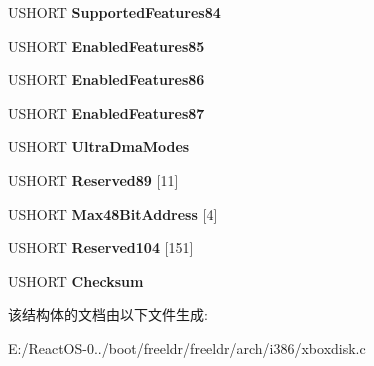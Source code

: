\begin{DoxyCompactItemize}
U\+S\+H\+O\+RT {\bfseries Supported\+Features84}
\item 
\mbox{\label{struct___i_d_e___d_r_i_v_e___i_d_e_n_t_i_f_y_a8e9829537d4672036589e1d4fa4ccbb3}} 
U\+S\+H\+O\+RT {\bfseries Enabled\+Features85}
\item 
\mbox{\label{struct___i_d_e___d_r_i_v_e___i_d_e_n_t_i_f_y_ae35050a0efdbc530e7638045e5b096e8}} 
U\+S\+H\+O\+RT {\bfseries Enabled\+Features86}
\item 
\mbox{\label{struct___i_d_e___d_r_i_v_e___i_d_e_n_t_i_f_y_ae9ae43fd8cdb48f83b5dfef9c3bdbbf0}} 
U\+S\+H\+O\+RT {\bfseries Enabled\+Features87}
\item 
\mbox{\label{struct___i_d_e___d_r_i_v_e___i_d_e_n_t_i_f_y_a50efc50dfe9b0b803aeb975f8a9ec9ad}} 
U\+S\+H\+O\+RT {\bfseries Ultra\+Dma\+Modes}
\item 
\mbox{\label{struct___i_d_e___d_r_i_v_e___i_d_e_n_t_i_f_y_a4204b3fa8fc31fde1c041b38defb46c5}} 
U\+S\+H\+O\+RT {\bfseries Reserved89} \mbox{[}11\mbox{]}
\item 
\mbox{\label{struct___i_d_e___d_r_i_v_e___i_d_e_n_t_i_f_y_ad5fc2578e9a5debf5cfc350feae194c3}} 
U\+S\+H\+O\+RT {\bfseries Max48\+Bit\+Address} \mbox{[}4\mbox{]}
\item 
\mbox{\label{struct___i_d_e___d_r_i_v_e___i_d_e_n_t_i_f_y_addd514bb4a64973a17fbdba468b0d612}} 
U\+S\+H\+O\+RT {\bfseries Reserved104} \mbox{[}151\mbox{]}
\item 
\mbox{\label{struct___i_d_e___d_r_i_v_e___i_d_e_n_t_i_f_y_ab0d119c557cc6d6144bb1e9ca5ba9d15}} 
U\+S\+H\+O\+RT {\bfseries Checksum}
\end{DoxyCompactItemize}


该结构体的文档由以下文件生成\+:\begin{DoxyCompactItemize}
\item 
E\+:/\+React\+O\+S-\/0../boot/freeldr/freeldr/arch/i386/xboxdisk.\+c\end{DoxyCompactItemize}

